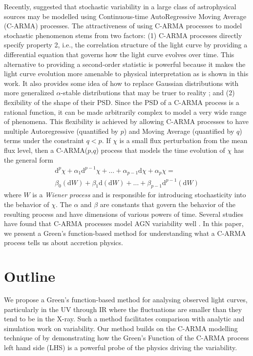 \documentclass[a4paper,fleqn,usenatbib]{mnras}
\begin{document}
Recently, \citet{Kelly14} suggested that stochastic variability in a large class of astrophysical sources may be modelled using Continuous-time AutoRegressive Moving Average (C-ARMA) processes. The attractiveness of using C-ARMA processes to model stochastic phenomenon stems from two factors: (1) C-ARMA processes directly specify property 2, i.e., the correlation structure of the light curve by providing a differential equation that governs how the light curve evolves over time. This alternative to providing a second-order statistic is powerful because it makes the light curve evolution more amenable to physical interpretation as is shown in this work. It also provides some idea of how to replace Gaussian distributions with more generalized $\alpha$-stable distributions that may be truer to reality \citep{BrockwellMarquardt05, BrockwellLinder09}; and (2) flexibility of the shape of their PSD. Since the PSD of a C-ARMA process is a rational function, it can be made arbitrarily complex to model a very wide range of phenomena. This flexibility is achieved by allowing C-ARMA processes to have multiple Autoregressive (quantified by $p$) and Moving Average (quantified by $q$) terms under the constraint $q < p$. If $\chi$ is a small flux perturbation from the mean flux level, then a C-ARMA($p$,$q$) process that models the time evolution of $\chi$ has the general form
\begin{multline}\label{eq:CARMAIntro}
\mathrm{d}^{p}\chi + \alpha_{1} \mathrm{d}^{p-1}\chi + \ldots + \alpha_{p-1} \mathrm{d}\chi + \alpha_{p} \chi = \\ \beta_{0} (\mathrm{d}W) + \beta_{1} \mathrm{d}(\mathrm{d}W) + \ldots + \beta_{p-1} \mathrm{d}^{p-1}(\mathrm{d}W)
\end{multline}
where $W$ is a \textit{Wiener process} and is responsible for introducing stochasticity into the behavior of $\chi$. The $\alpha$ and $\beta$ are constants that govern the behavior of the resulting process and have dimensions of various powers of time. Several studies have found that C-ARMA processes model AGN variability well \citep{Simm16, Caplar17}. In this paper, we present a Green's function-based method for understanding what a C-ARMA process tells us about accretion physics.

\section[Outline]{Outline}\label{sec:Outline}

We propose a Green's function-based method for analysing observed light curves, particularly in the UV through IR where the fluctuations are smaller than they tend to be in the X-ray. Such a method facilitates comparison with analytic and simulation work on variability. Our method builds on the C-ARMA modelling technique of \citet{Kelly14} by demonstrating how the Green's Function of the C-ARMA process left hand side (LHS) is a powerful probe of the physics driving the variability.
\end{document}
